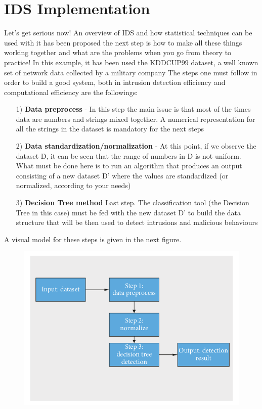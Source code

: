 \chapter{IDS Implementation}

Let's get serious now! An overview of IDS and how statistical techniques can be used with it has been proposed the next step is how to make all these things working together and what are the problems when you go from theory to practice!\newline\newline
In this example, it has been used the KDDCUP99 dataset, a well known set of network data collected by a military company\newline
The steps one must follow in order to build a good system, both in intrusion detection efficiency and computational efficiency are the followings:
\begin{itemize}
	\item[1)] \textbf{Data preprocess} - In this step the main issue is that most of the times data are numbers and strings mixed together. A numerical representation for all the strings in the dataset is mandatory for the next steps
	\item[2)] \textbf{Data standardization/normalization} - At this point, if we observe the dataset D, it can be seen that the range of numbers in D is not uniform. What must be done here is to run an algorithm that produces an output consisting of a new dataset D' where the values are standardized (or normalized, according to your needs)
	\item[3)] \textbf{Decision Tree method} Last step. The classification tool (the Decision Tree in this case) must be fed with the new dataset D' to build the data structure that will be then used to detect intrusions and malicious behaviours
\end{itemize}

A visual model for these steps is given in the next figure.

\begin{figure}[h!]
	\centering
	\includegraphics[width=\textwidth]{img/Steps.png}
\end{figure}

